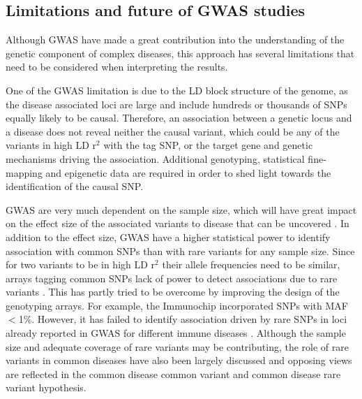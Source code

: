 \subsection{Limitations and future of GWAS studies}
Although GWAS have made a great contribution into the understanding of the genetic component of complex diseases, this approach has several limitations that need to be considered when interpreting the results. 

One of the GWAS limitation is due to the LD block structure of the genome, as the disease associated loci are large and include hundreds or thousands of SNPs equally likely to be causal. Therefore, an association between a genetic locus and a disease does not reveal neither the causal variant, which could be any of the variants in high LD r$^2$ with the tag SNP, or the target gene and genetic mechanisms driving the association. Additional genotyping, statistical fine-mapping and epigenetic data are required in order to shed light towards the identification of the causal SNP.

GWAS are very much dependent on the sample size, which will have great impact on the effect size of the associated variants to disease that can be uncovered \parencite{Visscher2017}. In addition to the effect size, GWAS have a higher statistical power to identify association with common SNPs than with rare variants for any sample size. Since for two variants to be in high LD r$^2$ their allele frequencies need to be similar, arrays tagging common SNPs lack of power to detect associations due to rare variants \parencite{Wray2005}. This has partly tried to be overcome by improving the design of the genotyping arrays. For example, the Immunochip incorporated SNPs with MAF${<}$1\%. However, it has failed to identify association driven by rare SNPs in loci already reported in GWAS for different immune diseases \parencite{Visscher2017}. Although the sample size and adequate coverage of rare variants may be contributing, the role of rare variants in common diseases have also been largely discussed and opposing views are reflected in the common disease common variant and common disease rare variant hypothesis. 


